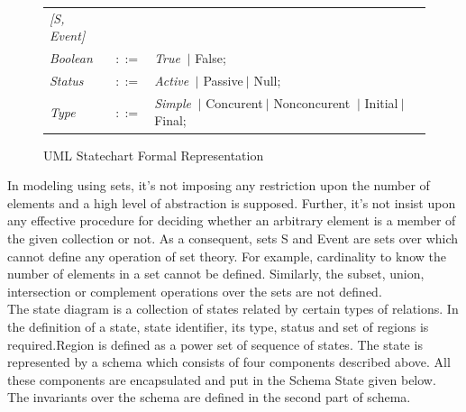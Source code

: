 \begin{figure}[ht!]
	\begin{tabular}{lll}
		\footnotesize                       
		\textit{[S, Event]}          &\footnotesize \\
		
		\footnotesize
		\textit{Boolean}            &\footnotesize $::=$         &\footnotesize \textit{True} $\ \vert $ {False};       \\   
		\footnotesize
		\textit{Status}            &\footnotesize $::=$         &\footnotesize \textit{Active}
		 $\ \vert $ {Passive}$\ \vert $ {Null};       \\ 
		\footnotesize
		\textit{Type}            &\footnotesize $::=$         &\footnotesize \textit{Simple}
		 	$\ \vert $ {Concurent}$\ \vert $ {Nonconcurent} $\ \vert $ {Initial}$\ \vert $ {Final};       \\
		 	 
		
	\end{tabular}
	\caption{UML Statechart Formal Representation}
	\label{statechart_formal_representation}
\end{figure}
In modeling using sets, it's not imposing any restriction upon the number of elements and a high level of
abstraction is supposed. Further, it's not insist upon any
effective procedure for deciding whether an arbitrary
element is a member of the given collection or not. As a
consequent, sets S and Event are sets over which cannot define any operation of set theory. For example,
cardinality to know the number of elements in a set cannot
be defined. Similarly, the subset, union, intersection or
complement operations over the sets are not defined.\\

The state diagram is a collection of states related by
certain types of relations. In the definition of a state, state identifier, its type, status and set of regions is required.Region is defined as a power set of sequence of states. The state is represented by a schema which consists of four components described above. All these components are
encapsulated and put in the Schema State given below.
The invariants over the schema are defined in the second
part of schema.\\

